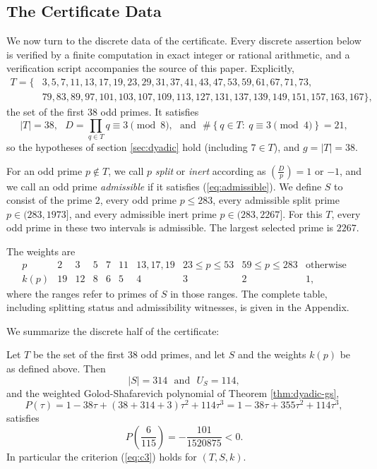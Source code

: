 \subsection{The Certificate Data}

We now turn to the discrete data of the certificate.  Every discrete assertion below is verified by a finite computation in exact integer or rational arithmetic, and a verification script accompanies the source of this paper.  Explicitly,
\[
\begin{aligned}
T=\{&3,5,7,11,13,17,19,23,29,31,37,41,43,47,53,59,61,67,71,73,\\
&79,83,89,97,101,103,107,109,113,127,131,137,139,149,151,157,163,167\},
\end{aligned}
\]
the set of the first $38$ odd primes.  It satisfies
\[
   |T|=38,\ \ \ D=\prod_{q\in T}q\equiv3\pmod{8},\ \ \ \text{and}\ \ \ \#\left\{q\in T:\ q\equiv3\pmod{4}\right\}=21,
\]
so the hypotheses of section \ref{sec:dyadic} hold (including $7\in T$), and $g=|T|=38$.

For an odd prime $p\notin T$, we call $p$ \emph{split} or \emph{inert} according as $\left(\frac{D}{p}\right)=1$ or $-1$, and we call an odd prime \emph{admissible} if it satisfies (\ref{eq:admissible}).  We define $S$ to consist of the prime $2$, every odd prime $p\leq283$, every admissible split prime $p\in(283,1973]$, and every admissible inert prime $p\in(283,2267]$.  For this $T$, every odd prime in these two intervals is admissible.  The largest selected prime is $2267$.

The weights are
\[
\begin{array}{c|ccccccccc}
 p&2&3&5&7&11&13,17,19&23\leq p\leq53&59\leq p\leq283&\text{otherwise}\\
\hline
 k(p)&19&12&8&6&5&4&3&2&1,
\end{array}
\]
where the ranges refer to primes of $S$ in those ranges.  The complete table, including splitting status and admissibility witnesses, is given in the Appendix.

We summarize the discrete half of the certificate:
\begin{proposition}\label{prop:t38}
Let $T$ be the set of the first $38$ odd primes, and let $S$ and the weights $k(p)$ be as defined above.  Then
\[
   |S|=314\ \ \ \text{and}\ \ \ U_S=114,
\]
and the weighted Golod-Shafarevich polynomial of Theorem \ref{thm:dyadic-gs},
\[
   P(\tau)=1-38\tau+(38+314+3)\tau^2+114\tau^3
   =1-38\tau+355\tau^2+114\tau^3,
\]
satisfies
\[
   P\!\left(\frac6{115}\right)=-\frac{101}{1520875}<0.
\]
In particular the criterion (\ref{eq:c3}) holds for $(T,S,k)$.
\end{proposition}

